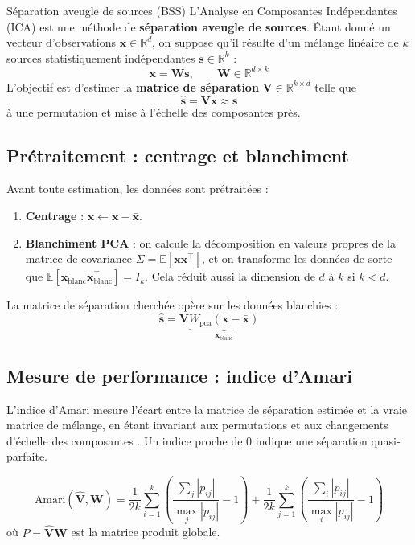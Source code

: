 \documentclass[12pt, a4paper]{article}
\newcommand{\V}{\mathbf{V}}        %
\newcommand{\W}{\mathbf{W}}        %
\newcommand{\x}{\mathbf{x}}        %
\newcommand{\s}{\mathbf{s}}        %
\newcommand{\E}{\mathbb{E}}        %
\newcommand{\R}{\mathbb{R}}
\begin{document}
\begin{definitionbox}{Séparation aveugle de sources (BSS)}
L'Analyse en Composantes Indépendantes (ICA) est une méthode de \textbf{séparation aveugle de
sources}. Étant donné un vecteur d'observations $\x \in \R^d$, on suppose qu'il résulte d'un
mélange linéaire de $k$ sources statistiquement indépendantes $\s \in \R^k$ :
\begin{equation}
  \x = \W \s, \qquad \W \in \R^{d \times k}
\end{equation}
L'objectif est d'estimer la \textbf{matrice de séparation} $\V \in \R^{k \times d}$ telle que
\begin{equation}
  \hat{\s} = \V \x \approx \s
\end{equation}
à une permutation et mise à l'échelle des composantes près.
\end{definitionbox}

\subsection{Prétraitement : centrage et blanchiment}

Avant toute estimation, les données sont prétraitées :
\begin{enumerate}
  \item \textbf{Centrage} : $\x \leftarrow \x - \bar{\x}$.
  \item \textbf{Blanchiment PCA} : on calcule la décomposition en valeurs propres de la matrice de
        covariance $\Sigma = \E[\x\x^\top]$, et on transforme les données de sorte que
        $\E[\x_{\text{blanc}}\x_{\text{blanc}}^\top] = I_k$.
        Cela réduit aussi la dimension de $d$ à $k$ si $k < d$.
\end{enumerate}
La matrice de séparation cherchée opère sur les données blanchies :
\[
  \hat{\s} = \V \underbrace{W_{\text{pca}}(\x - \bar{\x})}_{\x_{\text{blanc}}}
\]

\subsection{Mesure de performance : indice d'Amari}

L'indice d'Amari mesure l'écart entre la matrice de séparation estimée et la vraie matrice de
mélange, en étant invariant aux permutations et aux changements d'échelle des composantes
\cite{amari1996}. Un indice proche de 0 indique une séparation quasi-parfaite.

\begin{formulabox}
\[
  \text{Amari}(\hat{\V}, \W) =
  \frac{1}{2k} \sum_{i=1}^{k}
  \left( \frac{\sum_j |p_{ij}|}{\max_j |p_{ij}|} - 1 \right)
  + \frac{1}{2k} \sum_{j=1}^{k}
  \left( \frac{\sum_i |p_{ij}|}{\max_i |p_{ij}|} - 1 \right)
\]
où $P = \hat{\V} \W$ est la matrice produit globale.
\end{formulabox}
\end{document}
